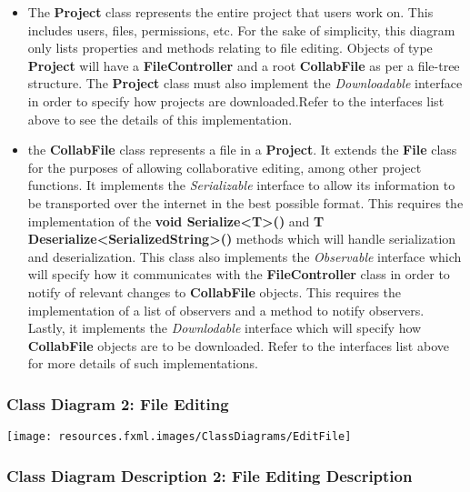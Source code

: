 \documentclass[twoside,letterpaper]{article}
\begin{document}
{\begin{itemize}
	\item The \textbf{Project} class represents the entire project that users work on. This includes users, files, permissions, etc. For the sake of simplicity, this diagram only lists properties and methods relating to file editing. Objects of type \textbf{Project} will have a \textbf{FileController} and a root \textbf{CollabFile} as per a file-tree structure. The \textbf{Project} class must also implement the \textit{Downloadable} interface in order to specify how projects are downloaded.Refer to the interfaces list above to see the details of this implementation.
	\item the \textbf{CollabFile} class represents a file in a \textbf{Project}. It extends the \textbf{File} class for the purposes of allowing collaborative editing, among other project functions. It implements the \textit{Serializable} interface to allow its information to be transported over the internet in the best possible format. This requires the implementation of the \textbf{void Serialize<T>()} and \textbf{T Deserialize<SerializedString>()} methods which will handle serialization and deserialization. This class also implements the \textit{Observable} interface which will specify how it communicates with the \textbf{FileController} class in order to notify of relevant changes to \textbf{CollabFile} objects. This requires the implementation of a list of observers and a method to notify observers. Lastly, it implements the \textit{Downlodable} interface which will specify how \textbf{CollabFile} objects are to be downloaded. Refer to the interfaces list above for more details of such implementations.
\end{itemize}

\subsubsection[Class Diagram 2: File Editing]{\rmfamily\bfseries\color{black}
	Class Diagram 2: File Editing}
\hypertarget{RefHeading22059017292}{}
\bigskip

\texttt{[image: resources.fxml.images/ClassDiagrams/EditFile]}

\newpage

\subsubsection[Class Diagram Description 2: File Editing Description]{\rmfamily\bfseries\color{black}
	Class Diagram Description 2: File Editing Description}
\hypertarget{RefHeading22059017292}{}

}
\end{document}
